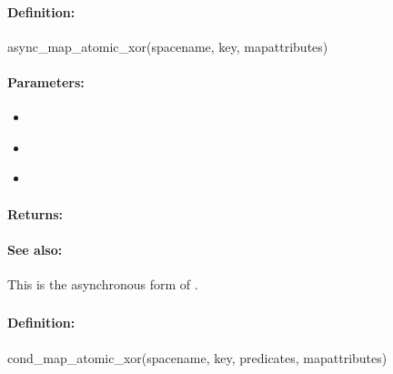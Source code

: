 \paragraph{Definition:}
\begin{rubycode}
async_map_atomic_xor(spacename, key, mapattributes)
\end{rubycode}

\paragraph{Parameters:}
\begin{itemize}[noitemsep]
\item {}\\

\item {}\\

\item {}\\

\end{itemize}

\paragraph{Returns:}


\paragraph{See also:}  This is the asynchronous form of .

\pagebreak
\subsubsection{}
\label{api:ruby:cond_map_atomic_xor}


\paragraph{Definition:}
\begin{rubycode}
cond_map_atomic_xor(spacename, key, predicates, mapattributes)
\end{rubycode}

